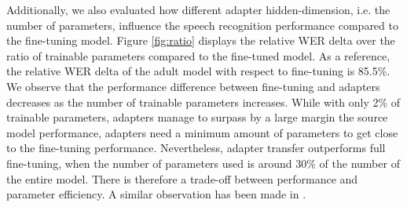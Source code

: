 Additionally, we also evaluated how different adapter hidden-dimension, i.e. the number of parameters, influence the speech recognition performance compared to the fine-tuning model.
Figure \ref{fig:ratio} displays the relative WER delta over the ratio of trainable parameters compared to the fine-tuned model. As a reference, the relative WER delta of the adult model with respect to fine-tuning is 85.5\%.
We observe that the performance difference between fine-tuning and adapters decreases as the number of trainable parameters increases.
While with only 2\% of trainable parameters, adapters manage to surpass by a large margin the source model performance, adapters need a minimum amount of parameters to get close to the fine-tuning performance. Nevertheless, adapter transfer outperforms full fine-tuning, when the number of parameters used is around 30\% of the number of the entire model. There is therefore a trade-off between performance and parameter efficiency. A similar observation has been made in \cite{fan2022draft}.

